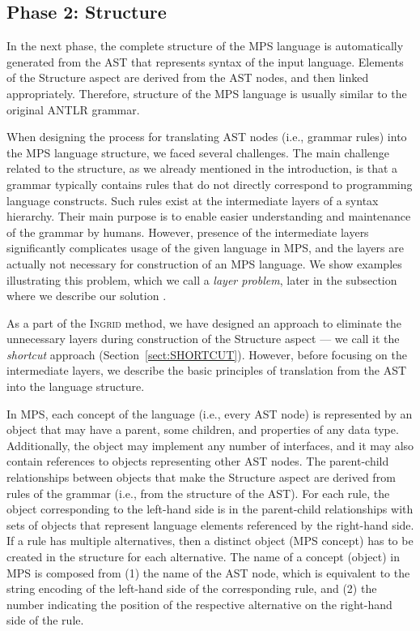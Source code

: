 \subsection{Phase 2: Structure}

In the next phase, the complete structure of the MPS language is automatically generated from the AST that represents syntax of the input language.
Elements of the Structure aspect are derived from the AST nodes, and then linked appropriately.
Therefore, structure of the MPS language is usually similar to the original ANTLR grammar.

When designing the process for translating AST nodes (i.e., grammar rules) into the MPS language structure, we faced several challenges.
The main challenge related to the structure, as we already mentioned in the introduction, is that a grammar typically contains rules that do not directly correspond to programming language constructs.
Such rules exist at the intermediate layers of a syntax hierarchy.
Their main purpose is to enable easier understanding and maintenance of the grammar by humans.
However, presence of the intermediate layers significantly complicates usage of the given language in MPS, and the layers are actually not necessary for construction of an MPS language.
We show examples illustrating this problem, which we call a \emph{layer problem}, later in the subsection where we describe our solution .

As a part of the \textsc{Ingrid} method, we have designed an approach to eliminate the unnecessary layers during construction of the Structure aspect --- we call it the \emph{shortcut} approach (Section~\ref{sect:SHORTCUT}).
However, before focusing on the intermediate layers, we describe the basic principles of translation from the AST into the language structure.

In MPS, each concept of the language (i.e., every AST node) is represented by an object that may have a parent, some children, and properties of any data type.
Additionally, the object may implement any number of interfaces, and it may also contain references to objects representing other AST nodes.
The parent-child relationships between objects that make the Structure aspect are derived from rules of the grammar (i.e., from the structure of the AST).
For each rule, the object corresponding to the left-hand side is in the parent-child relationships with sets of objects that represent language elements referenced by the right-hand side.
If a rule has multiple alternatives, then a distinct object (MPS concept) has to be created in the structure for each alternative.
The name of a concept (object) in MPS is composed from (1) the name of the AST node, which is equivalent to the string encoding of the left-hand side of the corresponding rule, and (2) the number indicating the position of the respective alternative on the right-hand side of the rule.

